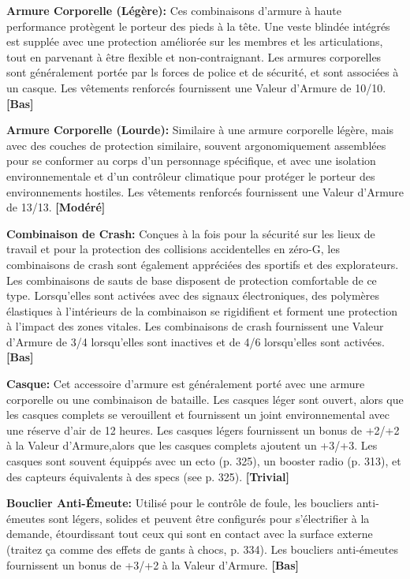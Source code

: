 \textbf{Armure Corporelle (Légère):} Ces combinaisons d'armure à haute performance protègent le porteur des pieds à la tête. Une veste blindée intégrés est supplée avec une protection améliorée sur les membres et les articulations, tout en parvenant à être flexible et non-contraignant. Les armures corporelles sont généralement portée par ls forces de police et de sécurité, et sont associées à un casque. Les vêtements renforcés fournissent une Valeur d'Armure de 10/10. \textbf{[Bas]} 

\textbf{Armure Corporelle (Lourde):} Similaire à une armure corporelle légère, mais avec des couches de protection similaire, souvent argonomiquement assemblées pour se conformer au corps d'un personnage spécifique, et avec une isolation environnementale et d'un contrôleur climatique pour protéger le porteur des environnements hostiles. Les vêtements renforcés fournissent une Valeur d'Armure de 13/13. \textbf{[Modéré]} 

\textbf{Combinaison de Crash:} Conçues à la fois pour la sécurité sur les lieux de travail et pour la protection des collisions accidentelles en zéro-G, les combinaisons de crash sont également appréciées des sportifs et des explorateurs. Les combinaisons de sauts de base disposent de protection comfortable de ce type. Lorsqu'elles sont activées avec des signaux électroniques, des polymères élastiques à l'intérieurs de la combinaison se rigidifient et forment une protection à l'impact des zones vitales. Les combinaisons de crash fournissent une Valeur d'Armure de 3/4 lorsqu'elles sont inactives et de 4/6 lorsqu'elles sont activées. \textbf{[Bas]} 

\textbf{Casque:} Cet accessoire d'armure est généralement porté avec une armure corporelle ou une combinaison de bataille. Les casques léger sont ouvert, alors que les casques complets se verouillent et fournissent un joint environnemental avec une réserve d'air de 12 heures. Les casques légers fournissent un bonus de +2/+2 à la  Valeur d'Armure,alors que les casques complets ajoutent un +3/+3. Les casques sont souvent équippés avec un ecto (p. 325), un booster radio (p. 313), et des capteurs équivalents à des specs (see p. 325). \textbf{[Trivial]} 

\textbf{Bouclier Anti-Émeute:} Utilisé pour le contrôle de foule, les boucliers anti-émeutes sont légers, solides et peuvent être configurés pour s'électrifier à la demande, étourdissant tout ceux qui sont en contact avec la surface externe (traitez ça comme des effets de gants à chocs, p. 334). Les boucliers anti-émeutes fournissent un bonus de +3/+2 à la Valeur d'Armure. \textbf{[Bas]} 

